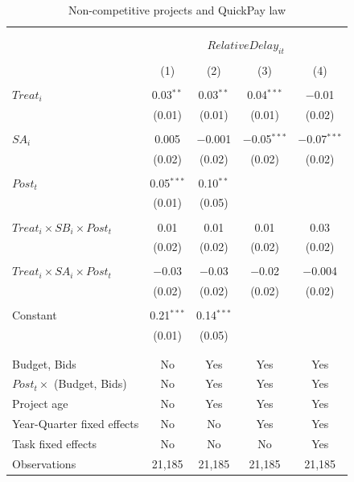 \documentclass[
]{article}
\begin{document}
\begin{table}[H] \centering 
  \caption{Non-competitive projects and QuickPay law} 
  \label{} 
\small 
\begin{tabular}{@{\extracolsep{-2pt}}lcccc} 
\\[-1.8ex]\hline 
\hline \\[-1.8ex] 
\\[-1.8ex] & \multicolumn{4}{c}{$RelativeDelay_{it}$} \\ 
\\[-1.8ex] & (1) & (2) & (3) & (4)\\ 
\hline \\[-1.8ex] 
 $Treat_i$ & 0.03$^{**}$ & 0.03$^{**}$ & 0.04$^{***}$ & $-$0.01 \\ 
  & (0.01) & (0.01) & (0.01) & (0.02) \\ 
  & & & & \\ 
 $SA_i$ & 0.005 & $-$0.001 & $-$0.05$^{***}$ & $-$0.07$^{***}$ \\ 
  & (0.02) & (0.02) & (0.02) & (0.02) \\ 
  & & & & \\ 
 $Post_t$ & 0.05$^{***}$ & 0.10$^{**}$ &  &  \\ 
  & (0.01) & (0.05) &  &  \\ 
  & & & & \\ 
 $Treat_i \times SB_i \times Post_t$ & 0.01 & 0.01 & 0.01 & 0.03 \\ 
  & (0.02) & (0.02) & (0.02) & (0.02) \\ 
  & & & & \\ 
 $Treat_i \times SA_i \times Post_t$ & $-$0.03 & $-$0.03 & $-$0.02 & $-$0.004 \\ 
  & (0.02) & (0.02) & (0.02) & (0.02) \\ 
  & & & & \\ 
 Constant & 0.21$^{***}$ & 0.14$^{***}$ &  &  \\ 
  & (0.01) & (0.05) &  &  \\ 
  & & & & \\ 
\hline \\[-1.8ex] 
Budget, Bids & No & Yes & Yes & Yes \\ 
$Post_t \times $  (Budget, Bids) & No & Yes & Yes & Yes \\ 
Project age & No & Yes & Yes & Yes \\ 
Year-Quarter fixed effects & No & No & Yes & Yes \\ 
Task fixed effects & No & No & No & Yes \\ 
Observations & 21,185 & 21,185 & 21,185 & 21,185 \\ 

\end{tabular}
\end{table}
\end{document}
